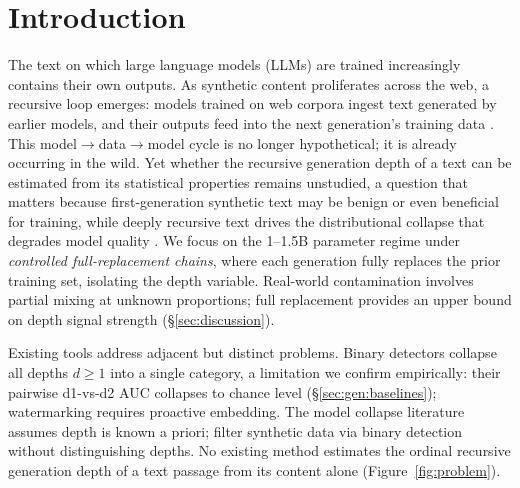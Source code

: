 \section{Introduction}
\label{sec:intro}

The text on which large language models (LLMs) are trained increasingly contains their own outputs.
As synthetic content proliferates across the web, a recursive loop emerges: models trained on web corpora ingest text generated by earlier models, and their outputs feed into the next generation's training data \cite{shumailov2024_nature,alemohammad2024_mad}.
This model$\to$data$\to$model cycle is no longer hypothetical; it is already occurring in the wild. Yet whether the recursive generation depth of a text can be estimated from its statistical properties remains unstudied, a question that matters because first-generation synthetic text may be benign or even beneficial for training, while deeply recursive text drives the distributional collapse that degrades model quality \cite{dohmatob2024_tale_of_tails}.
We focus on the 1--1.5B parameter regime under \emph{controlled full-replacement chains}, where each generation fully replaces the prior training set, isolating the depth variable. Real-world contamination involves partial mixing at unknown proportions; full replacement provides an upper bound on depth signal strength (\S\ref{sec:discussion}).

Existing tools address adjacent but distinct problems.
Binary detectors \cite{binoculars2024,fast_detectgpt2024,diveye2026} collapse all depths $d \geq 1$ into a single category, a limitation we confirm empirically: their pairwise d1-vs-d2 AUC collapses to chance level (\S\ref{sec:gen:baselines}); watermarking \cite{kirchenbauer2023_watermark} requires proactive embedding.
The model collapse literature \cite{shumailov2024_nature,dohmatob2024_tale_of_tails} assumes depth is known a priori; \citet{drayson2025_detection_prevents_collapse} filter synthetic data via binary detection without distinguishing depths.
No existing method estimates the ordinal recursive generation depth of a text passage from its content alone (Figure~\ref{fig:problem}).

